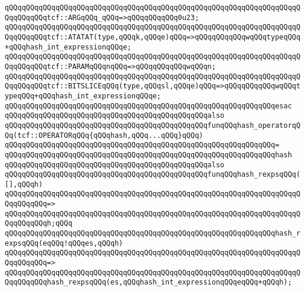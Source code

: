 \verb|qQQqqQQqqQQqqQQqqQQqqQQqqQQqqQQqqQQqqQQqqQQqqQQqqQQqqQQqqQQqqQQqqQQqqQQqqQQqqQQqtcf::ARGqQQq_qQQq=>qQQqqQQqqQQq0u23;|\newline
\verb|qQQqqQQqqQQqqQQqqQQqqQQqqQQqqQQqqQQqqQQqqQQqqQQqqQQqqQQqqQQqqQQqqQQqqQQqqQQqqQQqtcf::ATATAT(type,qQQqk,qQQqe)qQQq=>qQQqqQQqqQQqwqQQqtypeqQQq+qQQqhash_int_expressionqQQqe;|\newline
\verb|qQQqqQQqqQQqqQQqqQQqqQQqqQQqqQQqqQQqqQQqqQQqqQQqqQQqqQQqqQQqqQQqqQQqqQQqqQQqqQQqtcf::PARAMqQQqnqQQq=>qQQqqQQqqQQqwqQQqn;|\newline
\verb|qQQqqQQqqQQqqQQqqQQqqQQqqQQqqQQqqQQqqQQqqQQqqQQqqQQqqQQqqQQqqQQqqQQqqQQqqQQqqQQqtcf::BITSLICEqQQq(type,qQQqsl,qQQqe)qQQq=>qQQqqQQqqQQqwqQQqtypeqQQq+qQQqhash_int_expressionqQQqe;|\newline
\verb|qQQqqQQqqQQqqQQqqQQqqQQqqQQqqQQqqQQqqQQqqQQqqQQqqQQqqQQqqQQqqQQqesac|\newline
\newline
\verb|qQQqqQQqqQQqqQQqqQQqqQQqqQQqqQQqqQQqqQQqqQQqqQQqalso|\newline
\verb|qQQqqQQqqQQqqQQqqQQqqQQqqQQqqQQqqQQqqQQqqQQqqQQqfunqQQqhash_operatorqQQq(tcf::OPERATORqQQq{qQQqhash,qQQq...qQQq}qQQq)|\newline
\verb|qQQqqQQqqQQqqQQqqQQqqQQqqQQqqQQqqQQqqQQqqQQqqQQqqQQqqQQqqQQqqQQq=|\newline
\verb|qQQqqQQqqQQqqQQqqQQqqQQqqQQqqQQqqQQqqQQqqQQqqQQqqQQqqQQqqQQqqQQqhash|\newline
\newline
\verb|qQQqqQQqqQQqqQQqqQQqqQQqqQQqqQQqqQQqqQQqqQQqqQQqalso|\newline
\verb|qQQqqQQqqQQqqQQqqQQqqQQqqQQqqQQqqQQqqQQqqQQqqQQqfunqQQqhash_rexpsqQQq([],qQQqh)|\newline
\verb|qQQqqQQqqQQqqQQqqQQqqQQqqQQqqQQqqQQqqQQqqQQqqQQqqQQqqQQqqQQqqQQqqQQqqQQqqQQqqQQq=>|\newline
\verb|qQQqqQQqqQQqqQQqqQQqqQQqqQQqqQQqqQQqqQQqqQQqqQQqqQQqqQQqqQQqqQQqqQQqqQQqqQQqqQQqh;qQQq|\newline
\newline
\verb|qQQqqQQqqQQqqQQqqQQqqQQqqQQqqQQqqQQqqQQqqQQqqQQqqQQqqQQqqQQqqQQqhash_rexpsqQQq(eqQQq!qQQqes,qQQqh)|\newline
\verb|qQQqqQQqqQQqqQQqqQQqqQQqqQQqqQQqqQQqqQQqqQQqqQQqqQQqqQQqqQQqqQQqqQQqqQQqqQQqqQQq=>|\newline
\verb|qQQqqQQqqQQqqQQqqQQqqQQqqQQqqQQqqQQqqQQqqQQqqQQqqQQqqQQqqQQqqQQqqQQqqQQqqQQqqQQqhash_rexpsqQQq(es,qQQqhash_int_expressionqQQqeqQQq+qQQqh);|\newline
